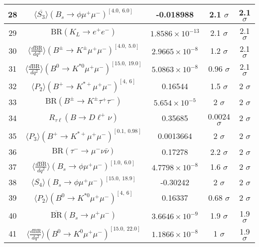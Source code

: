 \begin{longtable}{|c|c|c|c|c|}
28 &	 $\langle \overline{S_3}\rangle(B_s\to \phi \mu^+\mu^-)^{[4.0,\  6.0]}$ &	 -0.018988 &	 \cellcolor{red!0}2.1 $ \sigma$ &	 2.1 $ \sigma$ \\ \hline
29 &	 $\mathrm{BR}(K_L\to e^+e^-)$ &	 $1.8586\times 10^{-13}$ &	 \cellcolor{red!0}2.1 $ \sigma$ &	 2.1 $ \sigma$ \\ \hline
30 &	 $\langle \frac{d\mathrm{BR}}{dq^2} \rangle(B^\pm\to K^\pm \mu^+\mu^-)^{[4.0,\  5.0]}$ &	 $2.9665\times 10^{-8}$ &	 \cellcolor{green!41}1.2 $ \sigma$ &	 2.1 $ \sigma$ \\ \hline
31 &	 $\langle \frac{d\mathrm{BR}}{dq^2} \rangle(B^0\to K^{\ast 0}\mu^+\mu^-)^{[15.0,\  19.0]}$ &	 $5.0863\times 10^{-8}$ &	 \cellcolor{green!50}0.96 $ \sigma$ &	 2.1 $ \sigma$ \\ \hline
32 &	 $\langle P_2\rangle(B^+\to K^{\ast +}\mu^+\mu^-)^{[4,\  6]}$ &	 0.16544 &	 \cellcolor{green!29}1.5 $ \sigma$ &	 2 $ \sigma$ \\ \hline
33 &	 $\mathrm{BR}(B^\pm\to K^\pm \tau^+\tau^-)$ &	 $5.654\times 10^{-5}$ &	 \cellcolor{green!4}2 $ \sigma$ &	 2 $ \sigma$ \\ \hline
34 &	 $R_{\tau \ell}(B\to D\ell^+\nu)$ &	 0.35685 &	 \cellcolor{green!50}0.0024 $ \sigma$ &	 2 $ \sigma$ \\ \hline
35 &	 $\langle P_3\rangle(B^+\to K^{\ast +}\mu^+\mu^-)^{[0.1,\  0.98]}$ &	 0.0013664 &	 \cellcolor{green!0}2 $ \sigma$ &	 2 $ \sigma$ \\ \hline
36 &	 $\mathrm{BR}(\tau^-\to \mu^- \nu\bar\nu)$ &	 0.17278 &	 \cellcolor{red!11}2.2 $ \sigma$ &	 2 $ \sigma$ \\ \hline
37 &	 $\langle \frac{d\overline{\mathrm{BR}}}{dq^2} \rangle(B_s\to \phi \mu^+\mu^-)^{[1.0,\  6.0]}$ &	 $4.7798\times 10^{-8}$ &	 \cellcolor{green!18}1.6 $ \sigma$ &	 2 $ \sigma$ \\ \hline
38 &	 $\langle \overline{S_4}\rangle(B_s\to \phi \mu^+\mu^-)^{[15.0,\  18.9]}$ &	 -0.30242 &	 \cellcolor{green!0}2 $ \sigma$ &	 2 $ \sigma$ \\ \hline
39 &	 $\langle P_2\rangle(B^0\to K^{\ast 0}\mu^+\mu^-)^{[4,\  6]}$ &	 0.16337 &	 \cellcolor{green!50}0.68 $ \sigma$ &	 2 $ \sigma$ \\ \hline
40 &	 $\overline{\mathrm{BR}}(B_s\to \mu^+\mu^-)$ &	 $3.6646\times 10^{-9}$ &	 \cellcolor{green!0}1.9 $ \sigma$ &	 1.9 $ \sigma$ \\ \hline
41 &	 $\langle \frac{d\mathrm{BR}}{dq^2} \rangle(B^0\to K^0\mu^+\mu^-)^{[15.0,\  22.0]}$ &	 $1.1866\times 10^{-8}$ &	 \cellcolor{green!45}1 $ \sigma$ &	 1.9 $ \sigma$ \\ \hline

\end{longtable}
